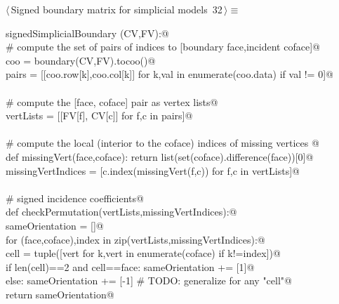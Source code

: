 \documentclass[11pt,oneside]{article}    %
\begin{document}
\begin{flushleft} \small \label{scrap52}
\protect{}$\langle\,$Signed boundary matrix for simplicial models\nobreak\ {\footnotesize 32}$\,\rangle\equiv$
\vspace{-1ex}
\begin{list}{}{} \item
\mbox{}\verb@def signedSimplicialBoundary (CV,FV):@\\
\mbox{}\verb@    # compute the set of pairs of indices to [boundary face,incident coface]@\\
\mbox{}\verb@    coo = boundary(CV,FV).tocoo()@\\
\mbox{}\verb@    pairs = [[coo.row[k],coo.col[k]] for k,val in enumerate(coo.data) if val != 0]@\\
\mbox{}\verb@@\\
\mbox{}\verb@    # compute the [face, coface] pair as vertex lists@\\
\mbox{}\verb@    vertLists = [[FV[f], CV[c]] for f,c in pairs]@\\
\mbox{}\verb@@\\
\mbox{}\verb@    # compute the local (interior to the coface) indices of missing vertices @\\
\mbox{}\verb@    def missingVert(face,coface): return list(set(coface).difference(face))[0]@\\
\mbox{}\verb@    missingVertIndices = [c.index(missingVert(f,c)) for f,c in vertLists]@\\
\mbox{}\verb@@\\
\mbox{}\verb@    # signed incidence coefficients@\\
\mbox{}\verb@    def checkPermutation(vertLists,missingVertIndices):@\\
\mbox{}\verb@        sameOrientation = []@\\
\mbox{}\verb@        for (face,coface),index in zip(vertLists,missingVertIndices):@\\
\mbox{}\verb@            cell = tuple([vert for k,vert in enumerate(coface) if k!=index])@\\
\mbox{}\verb@            if len(cell)==2 and cell==face: sameOrientation += [1]@\\
\mbox{}\verb@            else: sameOrientation += [-1]  # TODO: generalize for any "cell"@\\
\mbox{}\verb@        return sameOrientation@\\

\end{list}
\end{flushleft}
\end{document}

